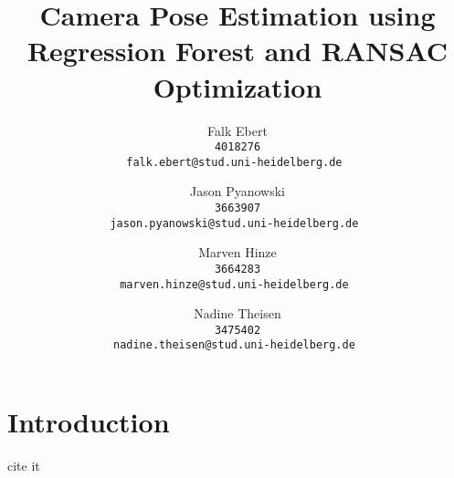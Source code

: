 \documentclass[final]{cvpr}
\begin{document}
\title{Camera Pose Estimation using Regression Forest and RANSAC Optimization}

\author{Falk Ebert\\
\tt 4018276\\
{\tt\small falk.ebert@stud.uni-heidelberg.de}
\and
Jason Pyanowski\\
\tt 3663907\\
{\tt\small jason.pyanowski@stud.uni-heidelberg.de}
\and
Marven Hinze\\
\tt 3664283\\
{\tt\small marven.hinze@stud.uni-heidelberg.de}
\and
Nadine Theisen\\
\tt 3475402\\
{\tt\small nadine.theisen@stud.uni-heidelberg.de}
}

\maketitle


\begin{abstract}
   
\end{abstract}

\section{Introduction}
cite it~\cite{shotton2013}
\end{document}
